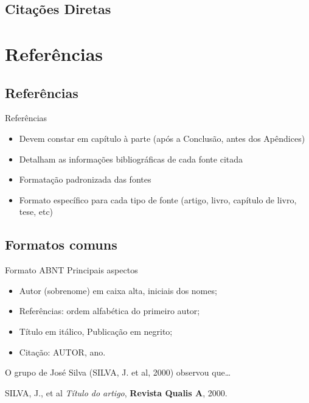 \documentclass{beamer}
\begin{document}
\subsection{Citações Diretas}

\section{Referências}

\subsection{Referências}

\begin{frame}{Referências}
  \begin{itemize}
  \item Devem constar em capítulo à parte (após a Conclusão, antes dos
    Apêndices)
  \item Detalham as informações bibliográficas de cada fonte citada
  \item Formatação padronizada das fontes
  \item Formato específico para cada tipo de fonte (artigo, livro,
    capítulo de livro, tese, etc)
  \end{itemize}
\end{frame}
\subsection{Formatos comuns}

\begin{frame}{Formato ABNT}
  Principais aspectos
  \begin{itemize}
  \item Autor (sobrenome) em caixa alta, iniciais dos nomes;
  \item Referências: ordem alfabética do primeiro autor;
  \item Título em itálico, Publicação em negrito;
  \item Citação: AUTOR, ano.
  \end{itemize}
  \begin{example}[Citação]
    O grupo de José Silva (SILVA, J. et al, 2000) observou que\ldots
  \end{example}
  \begin{example}[Referência]
    SILVA, J., et al {\em Título do artigo}, {\bf Revista Qualis A},
    2000.
  \end{example}
\end{frame}
\end{document}
